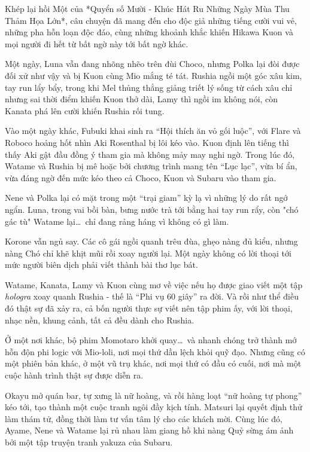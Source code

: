 \documentclass[main.tex]{subfiles}
\begin{document}
\color{black}

Khép lại hồi Một của *Quyển số Mười - Khúc Hát Ru Những Ngày Mùa Thu Thảm Họa Lớn*, câu chuyện đã mang đến cho độc giả những tiếng cười vui vẻ, những pha hỗn loạn độc đáo, cùng những khoảnh khắc khiến Hikawa Kuon và mọi người đi hết từ bất ngờ này tới bất ngờ khác.

Một ngày, Luna vẫn đang nhõng nhẽo trên đùi Choco, nhưng Polka lại đòi được đối xử như vậy và bị Kuon cùng Mio mắng té tát. Rushia ngồi một góc xâu kim, tay run lẩy bẩy, trong khi Mel thủng thẳng giảng triết lý sống từ cách xâu chỉ nhưng sai thời điểm khiến Kuon thở dài, Lamy thì ngồi im không nói, còn Kanata phá lên cười khiến Rushia rối tung.

Vào một ngày khác, Fubuki khai sinh ra ``Hội thích ăn vỏ gối luộc'', với Flare và Roboco hoảng hốt nhìn Aki Rosenthal bị lôi kéo vào. Kuon định lên tiếng thì thấy Aki gật đầu đồng ý tham gia mà không mảy may nghi ngờ. Trong lúc đó, Watame và Rushia bị mê hoặc bởi chương trình mang tên ``Lục lạc'', vừa bí ẩn, vừa đáng ngờ đến mức kéo theo cả Choco, Kuon và Subaru vào tham gia.

Nene và Polka lại có mặt trong một ``trại giam'' kỳ lạ vì những lý do rất ngớ ngẩn. Luna, trong vai bồi bàn, bưng nước trà tới bằng hai tay run rẩy, còn "chó gác tù" Watame lại\dots\ chỉ đang rảng háng vì không có gì làm.

Korone vẫn ngủ say. Các cô gái ngồi quanh trêu đùa, ghẹo nàng đủ kiểu, nhưng nàng Chó chỉ khẽ khịt mũi rồi xoay người lại. Một ngày không có lời thoại tới mức người biên dịch phải viết thành bài thơ lục bát.

Watame, Kanata, Lamy và Kuon cùng mơ về việc nếu họ được giao viết một tập \textit{hologra} xoay quanh Rushia - thế là ``Phi vụ 60 giây'' ra đời. Và rồi như thể điều đó thật sự đã xảy ra, cả bốn người thực sự viết nên tập phim ấy, với lời thoại, nhạc nền, khung cảnh, tất cả đều dành cho Rushia.

Ở một nơi khác, bộ phim Momotaro khởi quay\dots\ và nhanh chóng trở thành mớ hỗn độn phi logic với Mio-loli, nơi mọi thứ dần lệch khỏi quỹ đạo. Nhưng cũng có một phiên bản khác, ở một vũ trụ khác, nơi mọi thứ có đầu có cuối, nơi mà một cuộc hành trình thật sự được diễn ra.

Okayu mở quán bar, tự xưng là nữ hoàng, và rồi hàng loạt ``nữ hoàng tự phong'' kéo tới, tạo thành một cuộc tranh ngôi đầy kịch tính. Matsuri lại quyết định thử làm thám tử, đồng thời làm tư vấn tâm lý cho các khách mời. Cùng lúc đó, Ayame, Nene và Watame lại rủ nhau làm giang hồ khi nàng Quỷ sừng ám ảnh bởi một tập truyện tranh yakuza của Subaru.
\end{document}
